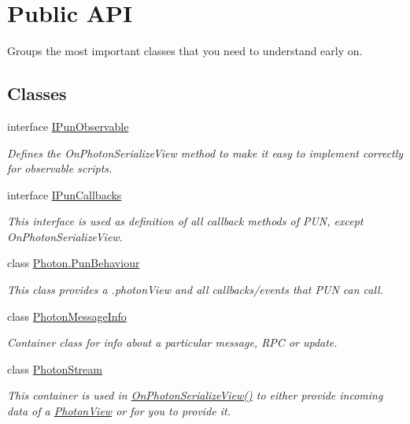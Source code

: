 \hypertarget{group__public_api}{}\section{Public A\+PI}
\label{group__public_api}


Groups the most important classes that you need to understand early on.  


\subsection*{Classes}
\begin{DoxyCompactItemize}
\item 
interface \hyperlink{interface_i_pun_observable}{I\+Pun\+Observable}
\begin{DoxyCompactList}\small\item\em Defines the On\+Photon\+Serialize\+View method to make it easy to implement correctly for observable scripts. \end{DoxyCompactList}\item 
interface \hyperlink{interface_i_pun_callbacks}{I\+Pun\+Callbacks}
\begin{DoxyCompactList}\small\item\em This interface is used as definition of all callback methods of P\+UN, except On\+Photon\+Serialize\+View. \end{DoxyCompactList}\item 
class \hyperlink{class_photon_1_1_pun_behaviour}{Photon.\+Pun\+Behaviour}
\begin{DoxyCompactList}\small\item\em This class provides a .photon\+View and all callbacks/events that P\+UN can call. \end{DoxyCompactList}\item 
class \hyperlink{class_photon_message_info}{Photon\+Message\+Info}
\begin{DoxyCompactList}\small\item\em Container class for info about a particular message, R\+PC or update. \end{DoxyCompactList}\item 
class \hyperlink{class_photon_stream}{Photon\+Stream}
\begin{DoxyCompactList}\small\item\em This container is used in \hyperlink{group__public_api_ggaf30bbea51cc8c4b1ddc239d1c5c1468fa864e7f0d7510922caf9c107b8dd771a3}{On\+Photon\+Serialize\+View()} to either provide incoming data of a \hyperlink{class_photon_view}{Photon\+View} or for you to provide it. \end{DoxyCompactList}\item 

\end{DoxyCompactItemize}
